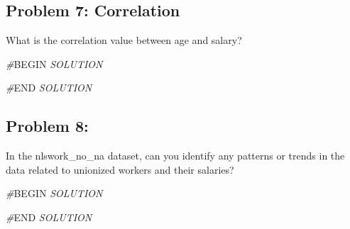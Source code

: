 \documentclass[
]{article}
\newenvironment{Shaded}{\begin{snugshade}}{\end{snugshade}}
\newcommand{\CommentTok}[1]{\textcolor[rgb]{0.56,0.35,0.01}{\textit{#1}}}
\newcommand{\RegionMarkerTok}[1]{#1}
\begin{document}
\hypertarget{problem-7-correlation}{%
\subsection{Problem 7: Correlation}\label{problem-7-correlation}}

What is the correlation value between age and salary?

\begin{Shaded}
\begin{Highlighting}[]
\CommentTok{\#}\RegionMarkerTok{BEGIN}\CommentTok{ SOLUTION}

\CommentTok{\#}\RegionMarkerTok{END}\CommentTok{ SOLUTION}
\end{Highlighting}
\end{Shaded}

\hypertarget{problem-8}{%
\subsection{Problem 8:}\label{problem-8}}

In the nlswork\_no\_na dataset, can you identify any patterns or trends
in the data related to unionized workers and their salaries?

\begin{Shaded}
\begin{Highlighting}[]
\CommentTok{\#}\RegionMarkerTok{BEGIN}\CommentTok{ SOLUTION}

\CommentTok{\#}\RegionMarkerTok{END}\CommentTok{ SOLUTION}
\end{Highlighting}
\end{Shaded}
\end{document}
